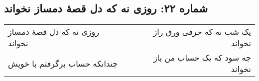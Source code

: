 \begin{center}
\section*{شماره ۲۲: روزی نه که دل قصۀ دمساز نخواند}
\label{sec:022}
\begin{longtable}{l p{0.5cm} r}
روزی نه که دل قصهٔ دمساز نخواند
&&
یک شب نه که حرفی ورق راز نخواند
\\
چندانکه حساب برگرفتم با خویش
&&
چه سود که یک حساب من باز نخواند
\\
\end{longtable}
\end{center}
